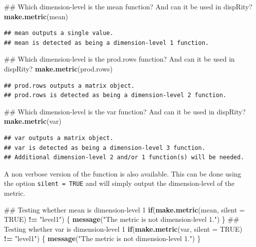 \documentclass[]{book}
\newenvironment{Shaded}{\begin{snugshade}}{\end{snugshade}}
\newcommand{\KeywordTok}[1]{\textcolor[rgb]{0.13,0.29,0.53}{\textbf{#1}}}
\newcommand{\DataTypeTok}[1]{\textcolor[rgb]{0.13,0.29,0.53}{#1}}
\newcommand{\StringTok}[1]{\textcolor[rgb]{0.31,0.60,0.02}{#1}}
\newcommand{\OtherTok}[1]{\textcolor[rgb]{0.56,0.35,0.01}{#1}}
\newcommand{\ControlFlowTok}[1]{\textcolor[rgb]{0.13,0.29,0.53}{\textbf{#1}}}
\newcommand{\OperatorTok}[1]{\textcolor[rgb]{0.81,0.36,0.00}{\textbf{#1}}}
\newcommand{\NormalTok}[1]{#1}
\theoremstyle{definition}
\theoremstyle{definition}
\theoremstyle{definition}
\theoremstyle{remark}
\begin{document}
\begin{Shaded}
\begin{Highlighting}[]
\NormalTok{## Which dimension-level is the mean function? And can it be used in dispRity?}
\KeywordTok{make.metric}\NormalTok{(mean)}
\end{Highlighting}
\end{Shaded}

\begin{verbatim}
## mean outputs a single value.
## mean is detected as being a dimension-level 1 function.
\end{verbatim}

\begin{Shaded}
\begin{Highlighting}[]
\NormalTok{## Which dimension-level is the prod.rows function? And can it be used in dispRity?}
\KeywordTok{make.metric}\NormalTok{(prod.rows)}
\end{Highlighting}
\end{Shaded}

\begin{verbatim}
## prod.rows outputs a matrix object.
## prod.rows is detected as being a dimension-level 2 function.
\end{verbatim}

\begin{Shaded}
\begin{Highlighting}[]
\NormalTok{## Which dimension-level is the var function? And can it be used in dispRity?}
\KeywordTok{make.metric}\NormalTok{(var)}
\end{Highlighting}
\end{Shaded}

\begin{verbatim}
## var outputs a matrix object.
## var is detected as being a dimension-level 3 function.
## Additional dimension-level 2 and/or 1 function(s) will be needed.
\end{verbatim}

A non verbose version of the function is also available. This can be
done using the option \texttt{silent\ =\ TRUE} and will simply output
the dimension-level of the metric.

\begin{Shaded}
\begin{Highlighting}[]
\NormalTok{## Testing whether mean is dimension-level 1}
\ControlFlowTok{if}\NormalTok{(}\KeywordTok{make.metric}\NormalTok{(mean, }\DataTypeTok{silent =} \OtherTok{TRUE}\NormalTok{) }\OperatorTok{!=}\StringTok{ "level1"}\NormalTok{) \{}
    \KeywordTok{message}\NormalTok{(}\StringTok{"The metric is not dimension-level 1."}\NormalTok{)}
\NormalTok{\}}
\NormalTok{## Testing whether var is dimension-level 1}
\ControlFlowTok{if}\NormalTok{(}\KeywordTok{make.metric}\NormalTok{(var, }\DataTypeTok{silent =} \OtherTok{TRUE}\NormalTok{) }\OperatorTok{!=}\StringTok{ "level1"}\NormalTok{) \{}
    \KeywordTok{message}\NormalTok{(}\StringTok{"The metric is not dimension-level 1."}\NormalTok{)}
\NormalTok{\}}
\end{Highlighting}
\end{Shaded}
\end{document}
